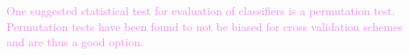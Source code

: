 \textcolor{violet}{One suggested statistical test for evaluation of classifiers is a permutation test\:\cite{ganzPermutationTestsClassification2017}\cite{ojalaPermutationTestsStudying2009}\cite{noirhommeBiasedBinomialAssessment2014}. Permutation tests have been found to not be biased for cross validation schemes and are thus a good option\:\cite{noirhommeBiasedBinomialAssessment2014}.}



\begin{comment}
Avoid contractions, write ``do not'' instead of ``don't.''

The word ``data'' is plural, not singular. The subscript for the permeability of vacuum $\mu _{0}$ is zero, not a lowercase letter ``o.'' The term for residual magnetization is ``remanence''; the adjective is ``remanent''; do not write ``remnance'' or ``remnant.'' Use the word ``micrometer'' instead of ``micron.'' A graph within a graph is an ``inset,'' not an ``insert.'' The word ``alternatively'' is preferred to the word ``alternately'' (unless you really mean something that alternates). Use the word ``whereas'' instead of ``while'' (unless you are referring to simultaneous events). Do not use the word ``essentially'' to mean ``approximately'' or ``effectively.'' Do not use the word ``issue'' as a euphemism for ``problem.'' When compositions are not specified, separate chemical symbols by en-dashes; for example, ``NiMn'' indicates the intermetallic compound Ni$_{0.5}$Mn$_{0.5}$ whereas ``Ni--Mn'' indicates an alloy of some composition Ni$_{x}$Mn$_{1-x}$.

Be aware of the different meanings of the homophones ``affect'' (usually a verb) and ``effect'' (usually a noun), ``complement'' and ``compliment,'' ``discreet'' and ``discrete,'' ``principal'' (e.g., ``principal investigator'') and ``principle'' (e.g., ``principle of measurement''). Do not confuse ``imply'' and ``infer.''

There is no period after the ``et'' in the Latin abbreviation ``\emph{et al.}'' (it is also italicized). The abbreviation ``i.e.,'' means ``that is,'' and the abbreviation ``e.g.,'' means ``for example'' (these abbreviations are not italicized).

When citing a section in a book, please give the relevant page numbers. In text, refer simply to the reference number. Do not use ``Ref.'' or ``reference'' except at the beginning of a sentence: ``Reference \cite{b3} shows $\ldots$ .''

Generally, this section provides an introduction and literature overview, aim of the work and research questions.
\end{comment}
